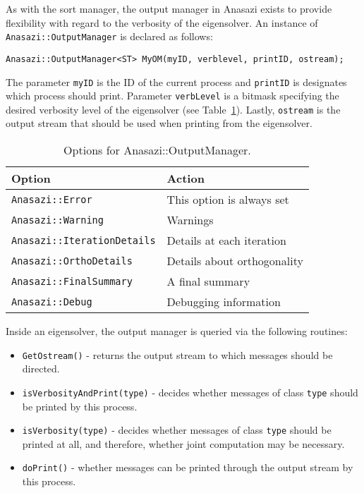 As with the sort manager, the output manager in Anasazi exists to provide
flexibility with regard to the verbosity of the eigensolver. An instance of
\verb!Anasazi::OutputManager! is declared as follows:
\begin{verbatim}
Anasazi::OutputManager<ST> MyOM(myID, verblevel, printID, ostream);
\end{verbatim}
The parameter \verb!myID! is the ID of the current process and \verb!printID! is
designates which process should print. Parameter \verb!verbLevel! is a bitmask
specifying the desired verbosity level of the eigensolver (see
Table~\ref{tab:anasazi:om}). Lastly, \verb!ostream! is the output stream that
should be used when printing from the eigensolver.

\begin{table}
\begin{center}
\begin{tabular}{| p{7cm} l |}
\hline
Option & Action \\
\hline
{\tt Anasazi::Error} & 
  This option is always set \\
{\tt Anasazi::Warning} & 
  Warnings \\
{\tt Anasazi::IterationDetails} & 
  Details at each iteration \\
{\tt Anasazi::OrthoDetails} & 
  Details about orthogonality \\
{\tt Anasazi::FinalSummary} & 
  A final summary \\
{\tt Anasazi::Debug} & 
  Debugging information \\
\hline
\end{tabular}
\caption{Options for Anasazi::OutputManager.}
\label{tab:anasazi:om}
\end{center}
\end{table}

Inside an eigensolver, the output manager is queried via the following
routines:
\begin{itemize}
\item \verb!GetOstream()! - returns the output stream to which messages should
be directed.
\item \verb!isVerbosityAndPrint(type)! - decides whether messages of class
\verb!type! should be printed by this process.
\item \verb!isVerbosity(type)! - decides whether messages of class \verb!type!
should be printed at all, and therefore, whether joint computation may be
necessary.
\item \verb!doPrint()! - whether messages can be printed through the output
stream by this process.
\end{itemize}


